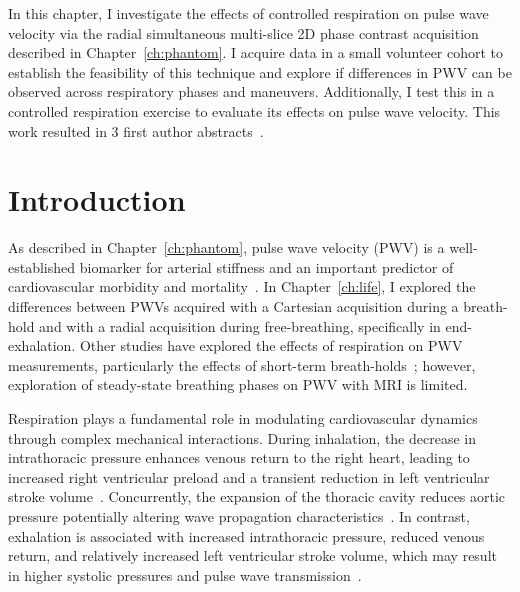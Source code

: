 In this chapter, I investigate the effects of controlled respiration on pulse wave velocity via the radial simultaneous multi-slice 2D phase contrast acquisition described in Chapter~\ref{ch:phantom}. I acquire data in a small volunteer cohort to establish the feasibility of this technique and explore if differences in PWV can be observed across respiratory phases and maneuvers. Additionally, I test this in a controlled respiration exercise to evaluate its effects on pulse wave velocity. This work resulted in 3 first author abstracts~\cite{narenAorticPWVValsalva,narenAorticPWVValsalvaB,narenQuantifyingDifferences}. 

\section{Introduction}\label{sec:sms_intro}
As described in Chapter~\ref{ch:phantom}, pulse wave velocity (PWV) is a well-established biomarker for arterial stiffness and an important predictor of cardiovascular morbidity and mortality~\cite{cavalcanteAorticStiffness2011,wentlandReviewMRIbasedMeasurements2014}. In Chapter~\ref{ch:life}, I explored the differences between PWVs acquired with a Cartesian acquisition during a breath-hold and with a radial acquisition during free-breathing, specifically in end-exhalation. Other studies have explored the effects of respiration on PWV measurements, particularly the effects of short-term breath-holds~\cite{sobolEffectShortTermBreath2019, vainerRadialArteryPulse2023,murphyEFFECTRESPIRATIONPULSE2010}; however, exploration of steady-state breathing phases on PWV with MRI is limited.

Respiration plays a fundamental role in modulating cardiovascular dynamics through complex mechanical interactions. During inhalation, the decrease in intrathoracic pressure enhances venous return to the right heart, leading to increased right ventricular preload and a transient reduction in left ventricular stroke volume~\cite{jozwiakHeartLungsInteractions2024, mahmoodHeartlungInteractionsMechanical2018}. Concurrently, the expansion of the thoracic cavity reduces aortic pressure potentially altering wave propagation characteristics~\cite{jozwiakHeartLungsInteractions2024, mahmoodHeartlungInteractionsMechanical2018}. In contrast, exhalation is associated with increased intrathoracic pressure, reduced venous return, and relatively increased left ventricular stroke volume, which may result in higher systolic pressures and pulse wave transmission~\cite{jozwiakHeartLungsInteractions2024, mahmoodHeartlungInteractionsMechanical2018}.

